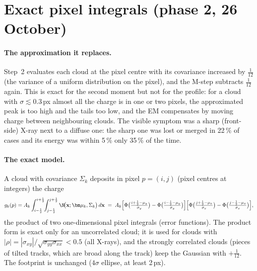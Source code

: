 \section{Exact pixel integrals (phase 2, 26 October)}\label{sec:phase2}

\paragraph{The approximation it replaces.} Step~2 evaluates each cloud at the pixel centre with its covariance increased by
$\tfrac1{12}$ (the variance of a uniform distribution on the pixel), and the M-step subtracts $\tfrac1{12}$ again. This is
exact for the second moment but not for the profile: for a cloud with $\sigma\lesssim0.3$\,px almost all the charge is in
one or two pixels, the approximated peak is too high and the tails too low, and the EM compensates by moving charge
between neighbouring clouds. The visible symptom was a sharp (front-side) X-ray next to a diffuse one: the sharp one was
lost or merged in 22\,\% of cases and its energy was within 5\,\% only 35\,\% of the time.

\paragraph{The exact model.} A cloud with covariance $\Sigma_k$ deposits in pixel $p=(i,j)$ (pixel centres at integers)
the charge
\begin{equation}
g_k(p)=A_k\int_{i-\frac12}^{i+\frac12}\!\!\int_{j-\frac12}^{j+\frac12}\N\!\big(\mathbf x;\bm\mu_k,\Sigma_k\big)\,d\mathbf x
\;=\;A_k\Big[\Phi\big(\tfrac{i+\frac12-\mu_{y}}{\sigma_{y}}\big)-\Phi\big(\tfrac{i-\frac12-\mu_{y}}{\sigma_{y}}\big)\Big]
\Big[\Phi\big(\tfrac{j+\frac12-\mu_{x}}{\sigma_{x}}\big)-\Phi\big(\tfrac{j-\frac12-\mu_{x}}{\sigma_{x}}\big)\Big],
\end{equation}
the product of two one-dimensional pixel integrals (error functions). The product form is exact only for an
uncorrelated cloud; it is used for clouds with $|\rho|=|\sigma_{xy}|/\sqrt{\sigma_{yy}\sigma_{xx}}<0.5$ (all X-rays),
and the strongly correlated clouds (pieces of tilted tracks, which are broad along the track) keep the Gaussian with
$+\tfrac1{12}$. The footprint is unchanged ($4\sigma$ ellipse, at least 2\,px).

